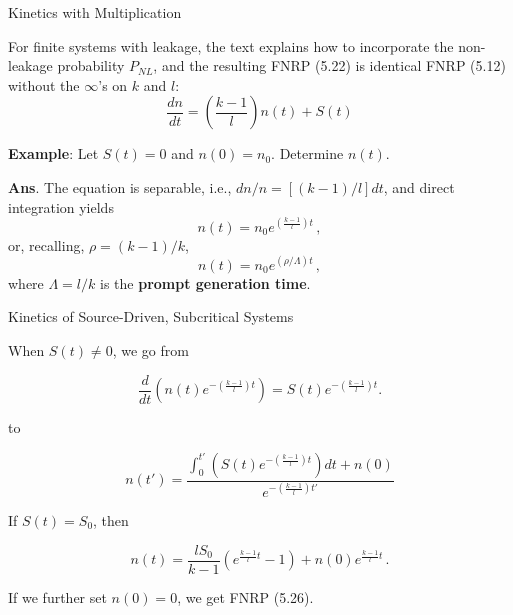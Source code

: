 \documentclass[aspectratio=1610]{beamer}
\begin{document}
\begin{frame}[fragile]{Kinetics with Multiplication}

For finite systems with leakage, the text explains how to incorporate the non-leakage probability $P_{NL}$, and the resulting FNRP (5.22) is identical FNRP (5.12) without the $\infty$'s on $k$ and $l$:
\begin{equation*}
\tag{FNRP 5.22}
\frac{dn}{dt}  = \left ( \frac{k - 1}{l} \right ) n(t) + S(t)
\end{equation*}
   
\vfill 
\pause 

{\bf Example}: Let $S(t) = 0$ and $n(0) = n_0$.  Determine $n(t)$.

\pause 
\textcolor{wcprimary}{
{\small {\bf Ans}.  The equation is separable, i.e., $dn/n = [(k-1)/l]dt$, and direct integration yields
\begin{equation*}
  \tag{FNRP 5.24}
  \boxed{ n(t)  =  n_0 e^{\left ( \displaystyle \frac{k - 1}{l}  \right ) t} } \, ,
\end{equation*}
or, recalling, $\rho = (k-1)/k$,
\begin{equation*}
  \tag{FNRP 5.24}
  \boxed{ n(t)  =  n_0 e^{ (\rho/\Lambda) t} } \, ,
\end{equation*}
where $\Lambda = l/k$ is the {\bf prompt generation time}.
}}

\pause 
\vfill 


 
\end{frame}



\begin{frame}[fragile]{Kinetics of Source-Driven, Subcritical Systems}


When $S(t) \neq 0$, we go from

\begin{equation*}
   \frac{d}{dt} \left ( n(t) e^{-\left(\frac{k-1}{l}\right )t} \right ) = S(t) e^{-\left(\frac{k-1}{l}\right )t} .
\end{equation*}

to

\begin{equation*}
   n(t') =  \frac{\displaystyle\int^{t'}_0  \left( S(t) e^{-\left(\frac{k-1}{l}\right )t} \right ) dt + n(0)}
                 {e^{-\left(\frac{k-1}{l}\right )t'}}
\end{equation*}

If $S(t) = S_0$, then

\begin{equation*}
   n(t) = \frac{l S_0}{k-1}
     \left (  e^{\frac{k-1}{l}t} - 1 \right )
     + n(0) e^{\frac{k-1}{l}t} \, .
\end{equation*}

If we further set $n(0) = 0$, we get FNRP (5.26).

\end{frame}
\end{document}
